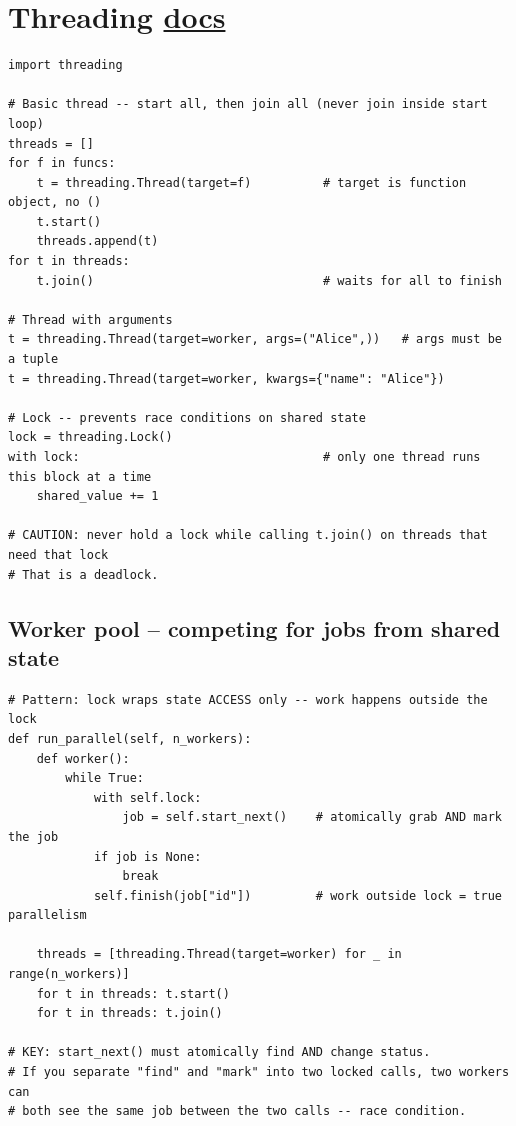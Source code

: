 \documentclass[10pt,letterpaper]{article}
\begin{document}
\section{Threading \normalfont\small\href{https://docs.python.org/3/library/threading.html}{docs}}

\begin{lstlisting}
import threading

# Basic thread -- start all, then join all (never join inside start loop)
threads = []
for f in funcs:
    t = threading.Thread(target=f)          # target is function object, no ()
    t.start()
    threads.append(t)
for t in threads:
    t.join()                                # waits for all to finish

# Thread with arguments
t = threading.Thread(target=worker, args=("Alice",))   # args must be a tuple
t = threading.Thread(target=worker, kwargs={"name": "Alice"})

# Lock -- prevents race conditions on shared state
lock = threading.Lock()
with lock:                                  # only one thread runs this block at a time
    shared_value += 1

# CAUTION: never hold a lock while calling t.join() on threads that need that lock
# That is a deadlock.
\end{lstlisting}

\subsection{Worker pool -- competing for jobs from shared state}
\begin{lstlisting}
# Pattern: lock wraps state ACCESS only -- work happens outside the lock
def run_parallel(self, n_workers):
    def worker():
        while True:
            with self.lock:
                job = self.start_next()    # atomically grab AND mark the job
            if job is None:
                break
            self.finish(job["id"])         # work outside lock = true parallelism

    threads = [threading.Thread(target=worker) for _ in range(n_workers)]
    for t in threads: t.start()
    for t in threads: t.join()

# KEY: start_next() must atomically find AND change status.
# If you separate "find" and "mark" into two locked calls, two workers can
# both see the same job between the two calls -- race condition.
\end{lstlisting}
\end{document}
